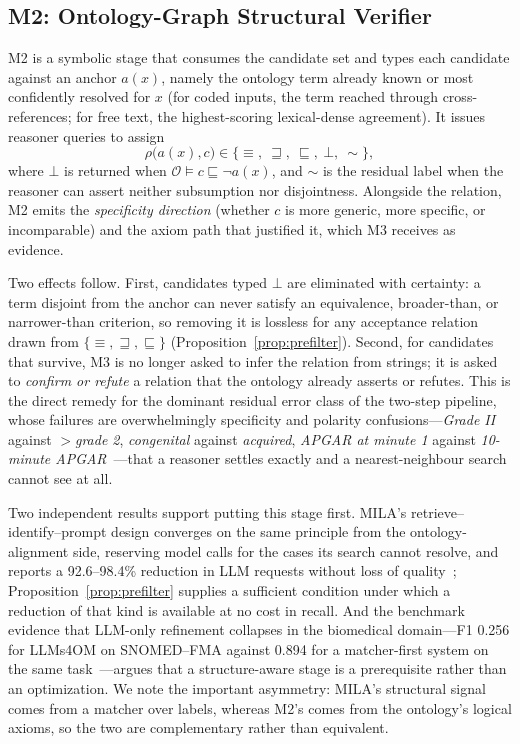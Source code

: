 \documentclass[conference]{IEEEtran}
\newcommand{\onto}{\mathcal{O}}
\newcommand{\rel}{\rho}
\begin{document}
\subsection{M2: Ontology-Graph Structural Verifier}

M2 is a symbolic stage that consumes the candidate set and types each candidate against an anchor $a(x)$, namely the ontology term already known or most confidently resolved for $x$ (for coded inputs, the term reached through cross-references; for free text, the highest-scoring lexical-dense agreement). It issues reasoner queries to assign
\begin{equation}
\rel\big(a(x), c\big) \in \{\equiv,\ \sqsupseteq,\ \sqsubseteq,\ \bot,\ \sim\},
\end{equation}
where $\bot$ is returned when $\onto \models c \sqsubseteq \neg a(x)$, and $\sim$ is the residual label when the reasoner can assert neither subsumption nor disjointness. Alongside the relation, M2 emits the \emph{specificity direction} (whether $c$ is more generic, more specific, or incomparable) and the axiom path that justified it, which M3 receives as evidence.

Two effects follow. First, candidates typed $\bot$ are eliminated with certainty: a term disjoint from the anchor can never satisfy an equivalence, broader-than, or narrower-than criterion, so removing it is lossless for any acceptance relation drawn from $\{\equiv, \sqsupseteq, \sqsubseteq\}$ (Proposition~\ref{prop:prefilter}). Second, for candidates that survive, M3 is no longer asked to infer the relation from strings; it is asked to \emph{confirm or refute} a relation that the ontology already asserts or refutes. This is the direct remedy for the dominant residual error class of the two-step pipeline, whose failures are overwhelmingly specificity and polarity confusions---\emph{Grade II} against \emph{$>$grade 2}, \emph{congenital} against \emph{acquired}, \emph{APGAR at minute 1} against \emph{10-minute APGAR}~\cite{b1}---that a reasoner settles exactly and a nearest-neighbour search cannot see at all.

Two independent results support putting this stage first. MILA's retrieve--identify--prompt design converges on the same principle from the ontology-alignment side, reserving model calls for the cases its search cannot resolve, and reports a 92.6--98.4\% reduction in LLM requests without loss of quality~\cite{b54}; Proposition~\ref{prop:prefilter} supplies a sufficient condition under which a reduction of that kind is available at no cost in recall. And the benchmark evidence that LLM-only refinement collapses in the biomedical domain---F1 0.256 for LLMs4OM on SNOMED--FMA against 0.894 for a matcher-first system on the same task~\cite{b56,b54}---argues that a structure-aware stage is a prerequisite rather than an optimization. We note the important asymmetry: MILA's structural signal comes from a matcher over labels, whereas M2's comes from the ontology's logical axioms, so the two are complementary rather than equivalent.
\end{document}
